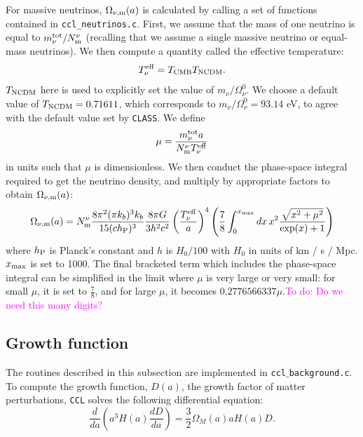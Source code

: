 \documentclass[\docopts]{\docclass}
\newcommand{\todo}[1]{\textcolor{magenta}{To do: #1}}
\begin{document}
For massive neutrinos, $\Omega_{\nu, {\rm m}}(a)$ is calculated by calling a set of functions contained in {\tt ccl\_neutrinos.c}. First, we assume that the mass of one neutrino is equal to $m_{\nu}^{\rm tot} / N_{\rm m}^{\nu}$ (recalling that we assume a single massive neutrino or equal-mass neutrinos). We then compute a quantity called the effective temperature:
\begin{equation}
T_{\nu}^{\rm eff} = T_{\rm CMB} T_{\rm NCDM}.
\label{Tnueff}
\end{equation}
$T_{\rm NCDM}$ here is used to explicitly set the value of $m_{\nu} / \Omega_{\nu}^0$. We choose a default value of $T_{\rm NCDM} = 0.71611$, which corresponds to $m_{\nu} / \Omega_{\nu}^0 = 93.14$ eV, to agree with the default value set by {\tt CLASS}. We define 
\begin{equation}
\mu = \frac{m_{\nu}^{\rm tot}a}{N_{\rm m}^\nu T_{\nu}^{\rm eff}}
\label{mnuOT}
\end{equation}
in units such that $\mu$ is dimensionless. We then conduct the phase-space integral required to get the neutrino density, and multiply by appropriate factors to obtain $\Omega_{\nu, {\rm m}}(a)$:
\begin{equation}
\Omega_{\nu, {\rm m}}(a) = N_{\rm m}^\nu \frac{8 \pi^2(\pi k_b )^3 k_b}{15(c h_{\rm P})^3} \frac{8 \pi G}{3h^2c^2} \left(\frac{T_{\nu}^{\rm eff}}{a}\right)^4 \left(\frac{7}{8}\int_0^{x_{\rm max}} dx \, x^2 \frac{\sqrt{x^2 + \mu^2}}{\exp(x) + 1}\right)
\label{Omnu}
\end{equation}
where $h_{\rm P}$ is Planck's constant and $h$ is $H_0/100$ with $H_0$ in units of km / s / Mpc. $x_{\rm max}$ is set to 1000. The final bracketed term which includes the phase-space integral can be simplified in the limit where $\mu$ is very large or very small: for small $\mu$, it is set to $\frac{7}{8}$, and for large $\mu$, it becomes $0.2776566337\mu$.\todo{Do we need this many digits?}



\subsection{Growth function}
\label{sec:growth}

The routines described in this subsection are implemented in {\tt ccl$\_$background.c}.
To compute the growth function, $D(a)$, the growth factor of matter perturbations, {\tt CCL} solves the following differential equation:
\begin{equation}
  \frac{d}{da}\left(a^3H(a)\frac{dD}{da}\right)=\frac{3}{2}\Omega_M(a)aH(a)D.
\end{equation}
\end{document}
